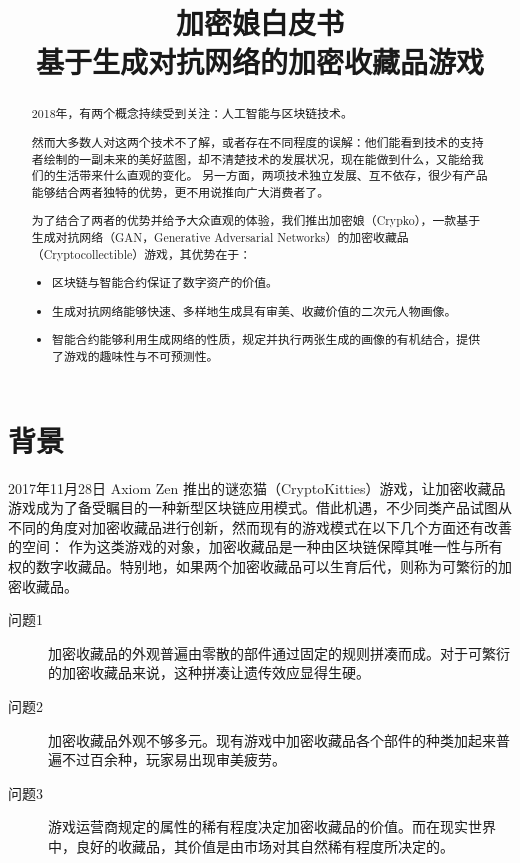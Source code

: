 \documentclass[a4paper]{article}
\title{加密娘白皮书 \\
  \large 基于生成对抗网络的加密收藏品游戏 \\
  \rightline{\small ver 0.8.1}
}
\author{}
\date{}
\begin{document}
\maketitle

\renewcommand\abstractname{摘　要}
\begin{abstract}

2018年，有两个概念持续受到关注：人工智能与区块链技术。

然而大多数人对这两个技术不了解，或者存在不同程度的误解：他们能看到技术的支持者绘制的一副未来的美好蓝图，却不清楚技术的发展状况，现在能做到什么，又能给我们的生活带来什么直观的变化。
另一方面，两项技术独立发展、互不依存，很少有产品能够结合两者独特的优势，更不用说推向广大消费者了。

为了结合了两者的优势并给予大众直观的体验，我们推出加密娘（Crypko），一款基于生成对抗网络（GAN，Generative Adversarial Networks）的加密收藏品（Cryptocollectible）游戏，其优势在于：
\begin{itemize}
\item 区块链与智能合约保证了数字资产的价值。
\item 生成对抗网络能够快速、多样地生成具有审美、收藏价值的二次元人物画像。
\item 智能合约能够利用生成网络的性质，规定并执行两张生成的画像的有机结合，提供了游戏的趣味性与不可预测性。
\end{itemize}

\end{abstract}

\thispagestyle{empty}

\newpage

\section{背景}

2017年11月28日 Axiom Zen 推出的谜恋猫（CryptoKitties）游戏\cite{cryptokitties}，让加密收藏品游戏成为了备受瞩目的一种新型区块链应用模式。借此机遇，不少同类产品\cite{cryptomons,cryptocountries,cryptopets,cryptoarts,cryptolandmarks,cryptofighters,etheremon,etherwaifu}试图从不同的角度对加密收藏品进行创新，然而现有的游戏模式在以下几个方面还有改善的空间：
作为这类游戏的对象，加密收藏品是一种由区块链保障其唯一性与所有权的数字收藏品。特别地，如果两个加密收藏品可以生育后代，则称为可繁衍的加密收藏品。

\begin{description}
\item [问题1\label{problem:1}] 加密收藏品的外观普遍由零散的部件通过固定的规则拼凑而成。对于可繁衍的加密收藏品来说，这种拼凑让遗传效应显得生硬。
\item [问题2\label{problem:2}] 加密收藏品外观不够多元。现有游戏中加密收藏品各个部件的种类加起来普遍不过百余种，玩家易出现审美疲劳。
\item [问题3\label{problem:3}] 游戏运营商规定的属性的稀有程度决定加密收藏品的价值。而在现实世界中，良好的收藏品，其价值是由市场对其自然稀有程度所决定的。
\end{description} 
\end{document}
